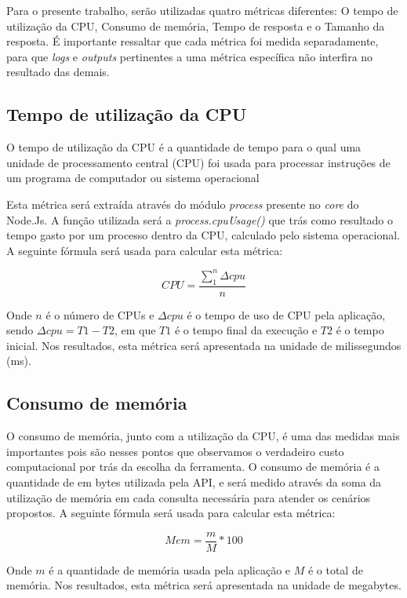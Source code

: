 Para o presente trabalho, serão utilizadas quatro métricas diferentes: O tempo de utilização da CPU, Consumo de memória, Tempo de resposta e o Tamanho da resposta. É importante ressaltar que cada métrica foi medida separadamente, para que \textit{logs} e \textit{outputs} pertinentes a uma métrica específica não interfira no resultado das demais.

\subsection*{Tempo de utilização da CPU}

O tempo de utilização da CPU é a quantidade de tempo para o qual uma unidade de processamento central (CPU) foi usada para processar instruções de um programa de computador ou sistema operacional

Esta métrica será extraída através do módulo \textit{process} presente no \textit{core} do Node.Js. A função utilizada será a \textit{process.cpuUsage()} que trás como resultado o tempo gasto por um processo dentro da CPU, calculado pelo sistema operacional. A seguinte fórmula será usada para calcular esta métrica: 

$$ CPU = \frac{\sum\limits_{1}^{n} \Delta cpu}{n} $$

Onde $n$ é o número de CPUs e $\Delta cpu$ é o tempo de uso de CPU pela aplicação, sendo $\Delta cpu = T1 - T2$, em que $T1$ é o tempo final da execução e $T2$ é o tempo inicial. Nos resultados, esta métrica será apresentada na unidade de milissegundos (ms).

\subsection*{Consumo de memória}

O consumo de memória, junto com a utilização da CPU, é uma das medidas mais importantes pois são nesses pontos que observamos o verdadeiro custo computacional por trás da escolha da ferramenta. O consumo de memória é a quantidade de em bytes utilizada pela API, e será medido através da soma da utilização de memória em cada consulta necessária para atender os cenários propostos. A seguinte fórmula será usada para calcular esta métrica: 

$$ Mem = \frac{m}{M}*100 $$

Onde $m$ é a quantidade de memória usada pela aplicação e $M$ é o total de memória. Nos resultados, esta métrica será apresentada na unidade de megabytes.

